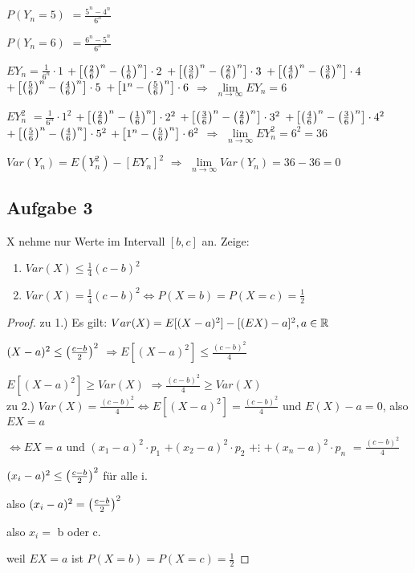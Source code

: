 $P(Y_n = 5) $
$=\frac{5^n - 4^n}{6^n}$

$P(Y_n = 6) $
$=\frac{6^n - 5^n}{6^n}$

$EY_n = \frac{1}{6^n} \cdot 1 $
$+  \left[  \left( \frac{2}{6} \right) ^n -  \left( \frac{1}{6} \right) ^n \right]  \cdot 2 $
$+  \left[  \left( \frac{3}{6} \right) ^n -  \left( \frac{2}{6} \right) ^n \right]  \cdot 3 $ 
$+  \left[  \left( \frac{4}{6} \right) ^n -  \left( \frac{3}{6} \right) ^n \right]  \cdot 4 $
$+  \left[  \left( \frac{5}{6} \right) ^n -  \left( \frac{4}{6} \right) ^n \right]  \cdot 5 $
$+  \left[ 1^n -  \left( \frac{5}{6} \right) ^n \right]  \cdot 6 $
$\Rightarrow $
$\lim\limits_{n \rightarrow \infty} EY_n = 6$

$EY_n^2 $
$= \frac{1}{6^n} \cdot 1^2 $
$+  \left[  \left( \frac{2}{6} \right) ^n -  \left( \frac{1}{6} \right) ^n \right]  \cdot 2^2 $
$+  \left[  \left( \frac{3}{6} \right) ^n -  \left( \frac{2}{6} \right) ^n \right]  \cdot 3^2 $ 
$+  \left[  \left( \frac{4}{6} \right) ^n -  \left( \frac{3}{6} \right) ^n \right]  \cdot 4^2 $
$+  \left[  \left( \frac{5}{6} \right) ^n -  \left( \frac{4}{6} \right) ^n \right]  \cdot 5^2 $
$+  \left[ 1^n -  \left( \frac{5}{6} \right) ^n \right]  \cdot 6^2 $
$\Rightarrow $
$\lim\limits_{n \rightarrow \infty} EY_n^2 = 6^2 = 36$

$Var(Y_n) = E(Y_n^2) - [EY_n]^2$
$\Rightarrow $
$\lim\limits_{n \rightarrow \infty} Var(Y_n) = 36 - 36 = 0$

\subsection{Aufgabe 3}
X nehme nur Werte im Intervall $[b,c]$ an. Zeige:
\begin{enumerate}
\item $Var(X) \leq \frac{1}{4} (c-b)^2$
\item $Var(X) = \frac{1}{4} (c-b)^2 \Leftrightarrow P(X=b) = P(X=c) = \frac{1}{2}$
\end{enumerate} 

\begin{proof}

zu 1.) Es gilt: $Var(X) = E[(X-a)^2] - [(EX) - a]^2, a\in \mathbb{R}$ 

$(X-a)^2 \leq  \left( \frac{c-b}{2} \right) ^2$
$\Rightarrow E[(X-a)^2] \leq \frac{(c-b)^2}{4}$

$E[(X-a)^2] \geq Var(X)$
$\Rightarrow \frac{(c-b)^2}{4} \geq Var(X)$\\

zu 2.) 
$Var(X) = \frac{(c-b)^2}{4} \Leftrightarrow E[(X-a)^2] = \frac{(c-b)^2}{4}$
und $ E(X) - a = 0$, also $EX=a$

$\Leftrightarrow EX=a $ und 
$(x_1 - a)^2 \cdot p_1 $
$+(x_2 - a)^2 \cdot p_2 $
$+\vdots $
$+(x_n - a)^2 \cdot p_n $
$=\frac{(c-b)^2}{4}$

$(x_i -a)^2 \leq  \left( \frac{c-b}{2} \right) ^2$ für alle i. 

also $(x_i - a)^2 =  \left( \frac{c-b}{2} \right) ^2$

also $x_i =$ b oder c. 

weil $EX = a$ ist $P(X=b) = P(X=c) = \frac{1}{2}$

\end{proof}